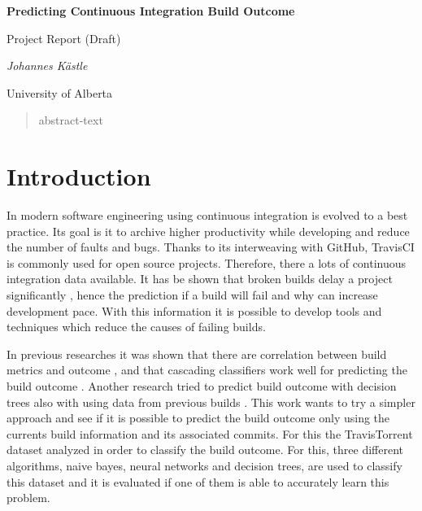 \documentclass[a4paper,11pt]{article}
\begin{document}
	
	\begin{center}
	{\huge\bfseries Predicting Continuous Integration Build Outcome \par}
	{\Large Project Report (Draft)\par}
	
	\vspace{1cm}
	{\Large\itshape Johannes Kästle\par}
	{ University of Alberta \par}
	\end{center}


\setlength{\parindent}{0pt}
\setlength{\parskip}{1.5ex plus0.5ex minus0.5ex}

\begin{abstract}
	abstract-text %
\end{abstract}

\section{Introduction}

In modern software engineering using continuous integration is evolved to a best practice. Its goal is it to archive higher productivity while developing and reduce the number of faults and bugs. Thanks to its interweaving with GitHub, TravisCI is commonly used for open source projects. Therefore, there a lots of continuous integration data available. It has be shown that broken builds delay a project significantly \cite{CIDelay}, hence the prediction if a build will fail and why can increase development pace. With this information it is possible to develop tools and techniques which reduce the causes of failing builds. 

In previous researches it was shown that there are correlation between build metrics and outcome \cite{correlation}, and that cascading classifiers work well for predicting the build outcome \cite{cascade}. Another research tried to predict build outcome with decision trees also with using data from previous builds \cite{treeTimes}. This work wants to try a simpler approach and see if it is possible to predict the build outcome only using the currents build information and its associated commits. For this the TravisTorrent \cite{msr17challenge} dataset analyzed in order to classify the build outcome. For this, three different algorithms, naive bayes, neural networks and decision trees, are used to classify this dataset and it is evaluated if one of them is able to accurately learn this problem. 
\end{document}
